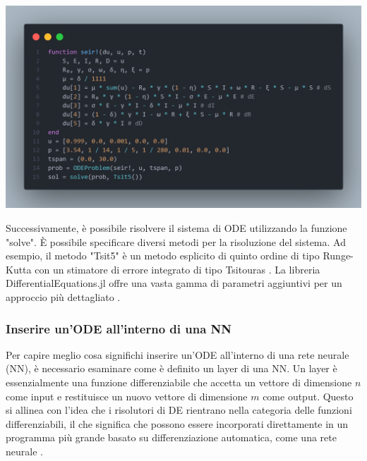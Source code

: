 \begin{minipage}{\linewidth}
    \centering
    \includegraphics[width=\textwidth]{img/fdefinition.png}
    \label{fig:ODE_Julia_example}
\end{minipage}

Successivamente, è possibile risolvere il sistema di ODE utilizzando la 
funzione "solve". È possibile specificare diversi metodi per la 
risoluzione del sistema. Ad esempio, il metodo "Tsit5" è un metodo 
esplicito di quinto ordine di tipo Runge-Kutta con un stimatore di 
errore integrato di tipo Tsitouras \cite{10.1016/j.camwa.2011.06.002}. 
La libreria DifferentialEquations.jl offre una vasta gamma di parametri 
aggiuntivi per un approccio più dettagliato \cite{rackauckas2017differentialequations}.

\subsubsection{Inserire un'ODE all'interno di una NN}

Per capire meglio cosa significhi inserire un'ODE all'interno di una 
rete neurale (NN), è necessario esaminare come è definito un layer di 
una NN. Un layer è essenzialmente una funzione differenziabile che 
accetta un vettore di dimensione $n$ come input e restituisce un nuovo 
vettore di dimensione $m$ come output. Questo si allinea con l'idea che 
i risolutori di DE rientrano nella categoria delle funzioni 
differenziabili, il che significa che possono essere incorporati 
direttamente in un programma più grande basato su differenziazione 
automatica, come una rete neurale \cite{Flux.jl-2018} \cite{pal2023lux}. 


